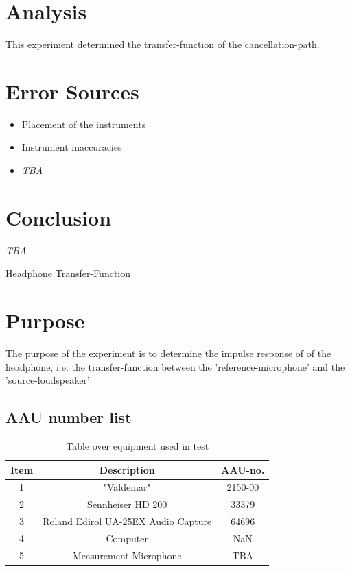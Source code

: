 \documentclass[12pt,a4paper,openright]{article}
\newcommand{\ra}[1]{\renewcommand{\arraystretch}{#1}}
\begin{document}
\section{Analysis}
This experiment determined the transfer-function of the cancellation-path.

\section{Error Sources}
\begin{itemize}
	\item Placement of the instruments
	\item Instrument inaccuracies 
	\item \textit{TBA}
\end{itemize}

\section{Conclusion}
\textit{TBA}
	
	
\pagebreak
\begin{Huge}
\begin{center}
Headphone Transfer-Function
\end{center}
\end{Huge}

\section{Purpose}
The purpose of the experiment is to determine the impulse response of of the  headphone, i.e. the transfer-function between the 'reference-microphone' and the 'source-loudspeaker'

\subsection{AAU number list}
\begin{table}[h]
	\centering
	\ra{1.3}
	\begin{tabular}{ c c c } \toprule
		{Item} & {Description} & {AAU-no.} \\ \bottomrule 
		1      &  "Valdemar"							& 2150-00	\\
		2      &  Sennheiser HD 200						& 33379		\\
		3      &  Roland Edirol UA-25EX Audio Capture	& 64696		\\
		4      &  Computer								& NaN		\\  
		5      &  Measurement Microphone				& TBA		\\ \bottomrule 
	\end{tabular}
	\caption{Table over equipment used in test}
	\label{tab:UsedEquipmentListning2}
\end{table}
\end{document}
